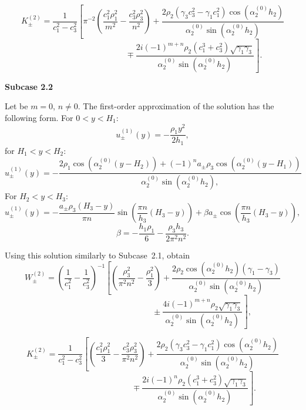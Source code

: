 \documentclass[12pt]{article}
\begin{document}
\[
K^{(2)}_\pm  = 
\frac{1}{c_1^2 -c_3^2} \left[ 
\pi^{-2} \left( \frac{c_1^2 \rho_1^2}{m^2}  - \frac{c_3^2 \rho_3^2}{n^2} \right) 
+ \frac{2 \rho_2 (\gamma_3 c_3^2 - \gamma_1 c_1^2) \cos(\alpha_2^{(0)} h_2)}{
\alpha_2^{(0)} \sin (\alpha_2^{(0)} h_2)
}
\right.
\]
\begin{equation}
\left.
\qquad \qquad \qquad \qquad \qquad 
\mp 
\frac{
2 i (-1)^{m+n} \rho_2 (c_1^3 + c_3^2)  \sqrt{\gamma_1 \gamma_3} 
}{
\alpha_2^{(0)} \sin (\alpha_2^{(0)} h_2)
}
\right].
\label{eqB33}
\end{equation}



{\bf Subcase 2.2}

Let be $m = 0$, $n \ne 0$. 
The first-order approximation of the solution has the following form.
For $0 < y < H_1$: 
\begin{equation}
u^{(1)}_\pm (y) = - \frac{\rho_1 y^2}{2 h_1},
\label{eqB34}
\end{equation}
for $H_1 < y < H_2$: 
\begin{equation}
u^{(1)}_\pm (y) = -
\frac{
2 \rho_1 \cos( \alpha_2^{(0)} (y-H_2)) + (-1)^n a_{\pm} \rho_3 \cos(\alpha_2^{(0)} (y - H_1))
}{
\alpha_2^{(0)} \sin(\alpha_2^{(0)} h_2), 
}
\label{eqB35}
\end{equation}
For $H_2 < y < H_3$: 
\begin{equation}
u^{(1)}_\pm (y) = 
- \frac{a_\pm \rho_3 (H_3 - y)}{\pi n} \sin \left( 
\frac{\pi n}{h_3} (H_3 - y)
\right)
+ 
\beta a_{\pm} \cos \left( 
\frac{\pi n}{h_3} (H_3 - y)
\right),
\label{eqB36}
\end{equation}
\begin{equation}
\beta = -\frac{h_1 \rho_1}{6} - \frac{\rho_3 h_3}{2 \pi^2 n^2}.
\label{eqB37}
\end{equation}

Using this solution similarly to Subcase~2.1, obtain
\[
W^{(2)}_\pm = 
\left( \frac{1}{c_1^2} - \frac{1}{c_3^2} \right)^{-1}
\left[
\left( 
\frac{\rho_3^2}{\pi^2 n^2} 
-
\frac{\rho_1^2}{3}
\right)
+ 
\frac{2 \rho_2 \cos(\alpha_2^{(0)} h_2) (\gamma_1 -\gamma_3)}{
\alpha_2^{(0)} \sin (\alpha_2^{(0)} h_2)}
\right. 
\]
\begin{equation}
\left.
\qquad \qquad \qquad \qquad \qquad \qquad 
\pm\frac{4 i (-1)^{m+n} \rho_2 \sqrt{\gamma_1 \gamma_3}}{
\alpha_2^{(0)} \sin (\alpha_2^{(0)} h_2)
}
\right],
\label{eqB38}
\end{equation} 

\[
K^{(2)}_\pm  = 
\frac{1}{c_1^2 -c_3^2} \left[ 
\left( \frac{c_1^2 \rho_1^2}{3}  - \frac{c_3^2 \rho_3^2}{\pi^2 n^2} \right) 
+ \frac{2 \rho_2 (\gamma_3 c_3^2 - \gamma_1 c_1^2) \cos(\alpha_2^{(0)} h_2)}{
\alpha_2^{(0)} \sin (\alpha_2^{(0)} h_2)
}
\right.
\]
\begin{equation}
\left.
\qquad \qquad \qquad \qquad \qquad 
\mp 
\frac{
2 i (-1)^{n} \rho_2 (c_1^3 + c_3^2)  \sqrt{\gamma_1 \gamma_3} 
}{
\alpha_2^{(0)} \sin (\alpha_2^{(0)} h_2)
}
\right].
\label{eqB39}
\end{equation}
\end{document}
